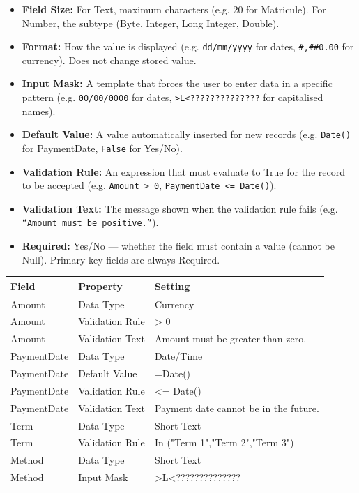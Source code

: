 \documentclass[11pt]{article}
\begin{document}
\begin{itemize}
    \item \textbf{Field Size:} For Text, maximum characters (e.g. 20 for Matricule). For Number, the subtype (Byte, Integer, Long Integer, Double).
    \item \textbf{Format:} How the value is displayed (e.g. \texttt{dd/mm/yyyy} for dates, \texttt{\#,\#\#0.00} for currency). Does not change stored value.
    \item \textbf{Input Mask:} A template that forces the user to enter data in a specific pattern (e.g. \texttt{00/00/0000} for dates, \texttt{>L<??????????????} for capitalised names).
    \item \textbf{Default Value:} A value automatically inserted for new records (e.g. \texttt{Date()} for PaymentDate, \texttt{False} for Yes/No).
    \item \textbf{Validation Rule:} An expression that must evaluate to True for the record to be accepted (e.g. \texttt{Amount > 0}, \texttt{PaymentDate <= Date()}).
    \item \textbf{Validation Text:} The message shown when the validation rule fails (e.g. \texttt{``Amount must be positive.''}).
    \item \textbf{Required:} Yes/No — whether the field must contain a value (cannot be Null). Primary key fields are always Required.
\end{itemize}

\begin{exemplebox}
\begin{center}
\begin{tabularx}{\linewidth}{|l|l|X|}\hline
\textbf{Field} & \textbf{Property} & \textbf{Setting} \\ \hline
Amount & Data Type & Currency \\ \hline
Amount & Validation Rule & > 0 \\ \hline
Amount & Validation Text & Amount must be greater than zero. \\ \hline
PaymentDate & Data Type & Date/Time \\ \hline
PaymentDate & Default Value & =Date() \\ \hline
PaymentDate & Validation Rule & <= Date() \\ \hline
PaymentDate & Validation Text & Payment date cannot be in the future. \\ \hline
Term & Data Type & Short Text \\ \hline
Term & Validation Rule & In ("Term 1","Term 2","Term 3") \\ \hline
Method & Data Type & Short Text \\ \hline
Method & Input Mask & >L<?????????????? \\ \hline
\end{tabularx}
\end{center}
\end{exemplebox}
\end{document}
